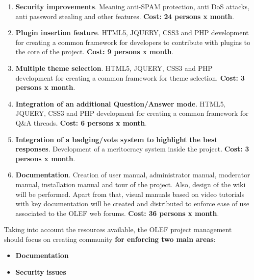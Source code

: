 \documentclass[11pt]{article}
\begin{document}
\begin{enumerate}\itemsep0pt
\item{\textbf{Security improvements}}. Meaning anti-SPAM protection, anti DoS attacks, anti password stealing and other features. \textbf{Cost: 24 persons x month}.
\item{\textbf{Plugin insertion feature}}. HTML5, JQUERY, CSS3 and PHP development for creating a common framework for developers to contribute with plugins to the core of the project. \textbf{Cost: 9 persons x month}.
\item{\textbf{Multiple theme selection}}. HTML5, JQUERY, CSS3 and PHP development for creating a common framework for theme selection. \textbf{Cost: 3 persons x month}.
\item{\textbf{Integration of an additional Question/Answer mode}}. HTML5, JQUERY, CSS3 and PHP development for creating a common framework for Q\&A threads. \textbf{Cost: 6 persons x month}.
\item{\textbf{Integration of a badging/vote system to highlight the best responses}}. Development of a meritocracy system inside the project. \textbf{Cost: 3 persons x month}.
\item{\textbf{Documentation}}. Creation of user manual, administrator manual, moderator manual, installation manual and tour of the project. Also, design of the wiki will be performed. Apart from that, visual manuals based on video tutorials with key documentation will be created and distributed to enforce ease of use associated to the OLEF web forums.  \textbf{Cost: 36 persons x month}.
\end{enumerate}
Taking into account the resources available, the OLEF project management should focus on creating community \textbf{for enforcing two main areas}:
\begin{itemize}\itemsep0pt
\item{\textbf{Documentation}}
\item{\textbf{Security issues}}
\end{itemize}
\end{document}
